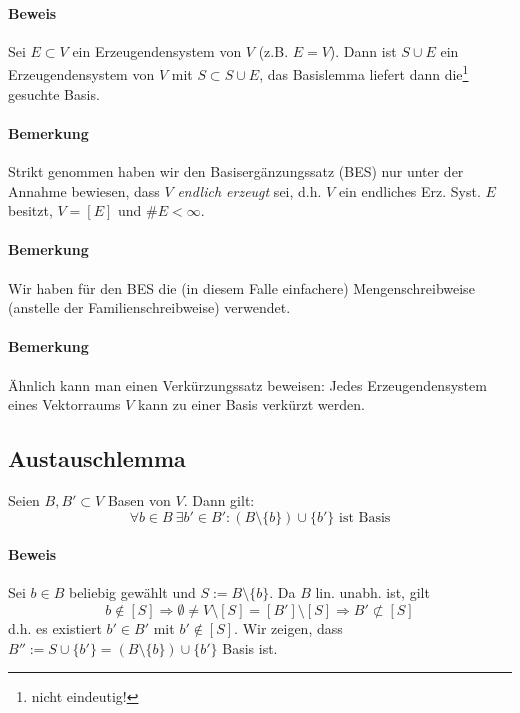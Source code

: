 \paragraph{Beweis}
    Sei $E\subset V$ ein Erzeugendensystem von $V$ (z.B. $E=V$). Dann ist $S\cup E$ ein Erzeugendensystem von $V$ mit $S\subset S\cup E$, das Basislemma liefert dann die\footnote{nicht eindeutig!} gesuchte Basis.

\paragraph{Bemerkung}
    Strikt genommen haben wir den Basisergänzungssatz (BES) nur unter der Annahme bewiesen, dass $V$ \emph{endlich erzeugt} sei, d.h. $V$ ein endliches Erz. Syst. $E$ besitzt, $V=[E]$ und $\#E<\infty$.

\paragraph{Bemerkung}
    Wir haben für den BES die (in diesem Falle einfachere) Mengenschreibweise (anstelle der Familienschreibweise) verwendet.

\paragraph{Bemerkung}
    Ähnlich kann man einen Verkürzungssatz beweisen: Jedes Erzeugendensystem eines Vektorraums $V$ kann zu einer Basis verkürzt werden.

\subsection{Austauschlemma}
    \begin{Lemma}[Austauschlemma]
    	Seien $B,B' \subset V$ Basen von $V$. Dann gilt:
        \[\forall b\in B\ \exists b' \in B': (B\setminus\{b\})\cup\{b'\} \text{ ist Basis}\]
    \end{Lemma}
    
\paragraph{Beweis}
    Sei $b\in B$ beliebig gewählt und $S:= B\setminus \{b\}$. Da $B$ lin. unabh. ist, gilt 
        \[b\notin [S] \Rightarrow \emptyset \neq V\setminus [S] = [B']\setminus [S] \Rightarrow B' \not\subset [S]\]
    d.h. es existiert $b' \in B'$ mit $b' \notin [S]$. Wir zeigen, dass $B'' := S\cup \{b'\} = (B\setminus\{b\})\cup \{b'\}$ Basis ist.
    
